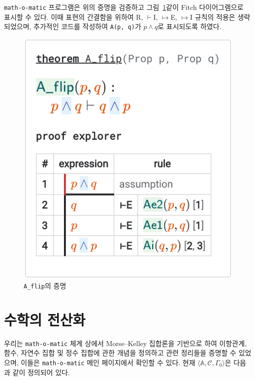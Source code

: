 \documentclass[10pt,twocolumn]{article}
\theoremstyle{definition}
\begin{document}
\texttt{math-o-matic} 프로그램은 위의 증명을 검증하고 그림~\ref{fig:Aflip}\과 같이 Fitch 다이어그램으로 표시할 수 있다. 이때 표현의 간결함을 위하여 R, $\vdash$I, $\mapsto$E, $\mapsto$I 규칙의 적용은 생략되었으며, 추가적인 코드를 작성하여 \verb!A(p, q)!가 $p\land q$로 표시되도록 하였다.

\begin{figure}[bt!] \centering
	\includegraphics[scale=.18]{A_flip}
	\caption{\texttt{A\_flip}의 증명} \label{fig:Aflip}
\end{figure}


\section{수학의 전산화}

우리는 \texttt{math-o-matic} 체계 상에서 Morse--Kelley 집합론을 기반으로 하여 이항관계, 함수, 자연수 집합 및 정수 집합에 관한 개념을 정의하고 관련 정리들을 증명할 수 있었으며, 이들은 \texttt{math-o-matic} 메인 페이지에서 확인할 수 있다. 현재 $\langle\mathbb A, \mathcal C, \Gamma_0\rangle$은 다음과 같이 정의되어 있다.
\end{document}
